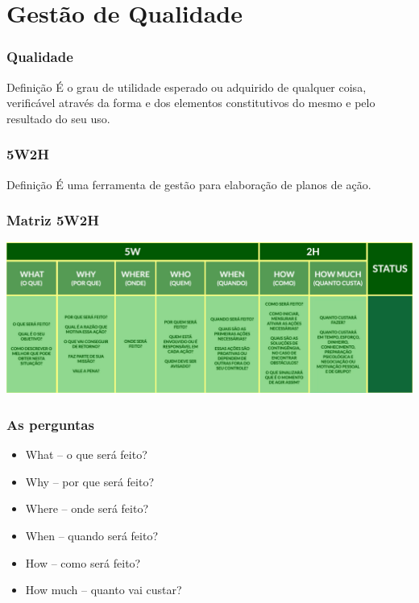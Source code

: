 \documentclass[aspectratio=169]{beamer}
\begin{document}
\section{Gestão de Qualidade}

\begin{frame}
	\frametitle{Qualidade}

	\begin{block}{Defini\c cão}
		 É o grau de utilidade esperado ou adquirido de qualquer coisa, verificável através da forma e dos elementos constitutivos do mesmo e pelo resultado do seu uso.
	\end{block}
\end{frame}

\begin{frame}
	\frametitle{5W2H}

	\begin{block}{Defini\c cão}
		 É uma ferramenta de gestão para elaboração de planos de ação.
	\end{block}
\end{frame}

\begin{frame}
	\frametitle{Matriz 5W2H}
	
	\begin{center}
		\includegraphics[scale=0.35]{img/5w2h}
	\end{center}
\end{frame}


\begin{frame}
	\frametitle{As perguntas}

	\begin{itemize}
		\item What – o que será feito?
		\item Why – por que será feito?
		\item Where – onde será feito?
		\item When – quando será feito?
	\end{itemize}
	
	\begin{itemize}
		\item How – como será feito?
		\item How much – quanto vai custar?
	\end{itemize}		
\end{frame}
\end{document}
